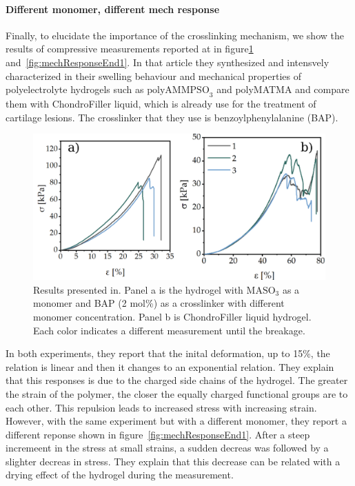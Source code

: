 \paragraph{Different monomer, different mech response}
Finally, to elucidate the importance of the crosslinking mechanism, we show the results of compressive measurements reported at\citep{romischkeSwellingMechanicalCharacterization2022} in figure\ref{fig:mechResponseEnd} and~\ref{fig:mechResponseEnd1}.
In that article they synthesized and intensvely characterized in their swelling behaviour and mechanical properties of polyelectrolyte hydrogels such as $\mathrm{polyAMMPSO}_3$ and polyMATMA and compare them with ChondroFiller liquid, which is already use for the treatment of cartilage lesions.
The crosslinker that they use is benzoylphenylalanine (BAP).

\begin{figure}[ht!]
    \centering
    \includegraphics[width=12cm]{figs/mechResponse/2-ab.png}
    \caption{
        Results presented in\citep{romischkeSwellingMechanicalCharacterization2022}. 
    Panel a is the hydrogel with $\mathrm{MASO}_3$ as a monomer and BAP (2 mol\%) as a crosslinker with different monomer concentration.
    Panel b is ChondroFiller liquid hydrogel.
    Each color indicates a different measurement until the breakage.    
}\label{fig:mechResponseEnd}
\end{figure}

In both experiments, they report that the inital deformation, up to 15\%, the relation is linear and then it changes to an exponential relation.
They explain that this responses is due to the charged side chains of the hydrogel.
The greater the strain of the polymer, the closer the equally charged functional groups are to each other.
This repulsion leads to increased stress with increasing strain.
However, with the same experiment but with a different monomer, they report a different reponse shown in figure~\ref{fig:mechResponseEnd1}.
After a steep incremeent in the stress at small strains, a sudden decreas was followed by a slighter decreas in stress.
They explain that this decrease can be related with a drying effect of the hydrogel during the measurement.

